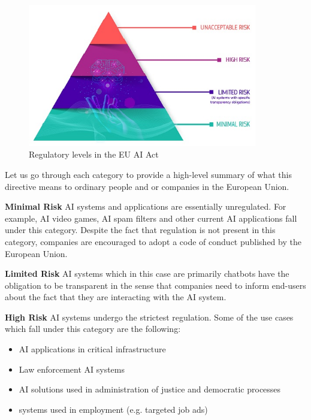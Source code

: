 \begin{figure}[htpb]
\begin{centering}
\includegraphics[width=10cm]{./assets/images/eu_ai_risks_pyramid.jpg}
\par\end{centering}
\caption{Regulatory levels in the EU AI Act \cite{eu_ai_regulation_picture}
 \label{fig:ai-act-pyramid}}
\end{figure}

Let us go through each category to provide a high-level summary of what this directive means to ordinary people and or companies in the European Union.

\textbf{Minimal Risk} AI systems and applications are essentially unregulated. For example, AI video games, AI spam filters and other current AI applications fall under this category. Despite the fact that regulation is not present in this category, companies are encouraged to adopt a code of conduct published by the European Union.

\textbf{Limited Risk} AI systems which in this case are primarily chatbots have the obligation to be transparent in the sense that companies need to inform end-users about the fact that they are interacting with the AI system.

\textbf{High Risk} AI systems undergo the strictest regulation. Some of the use cases which fall under this category are the following\cite{eu_ai_act_summary}:
\begin{itemize}
    \item AI applications in critical infrastructure
    \item Law enforcement AI systems
    \item AI solutions used in administration of justice and democratic processes
    \item systems used in employment (e.g. targeted job ads)
\end{itemize}

